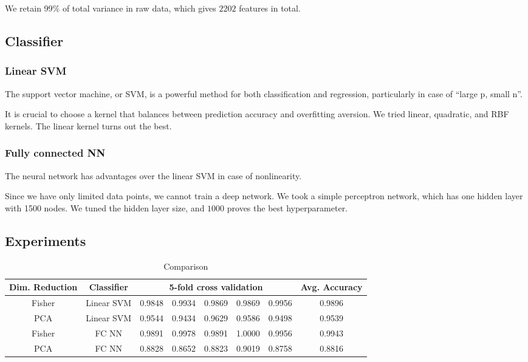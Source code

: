 \documentclass{article}
\begin{document}
{{{            We retain 99\% of total variance in raw data, which gives $2202$ features in total. 
        }
    }

    \subsection{Classifier}
    {
        \subsubsection{Linear SVM}
        {
            The support vector machine, or SVM, is a powerful method for both classification and regression, particularly in case of ``large p, small n''.

            It is crucial to choose a kernel that balances between prediction accuracy and overfitting aversion. 
            We tried linear, quadratic, and RBF kernels. The linear kernel turns out the best.
        }

        \subsubsection{Fully connected NN}
        {
            The neural network has advantages over the linear SVM in case of nonlinearity. 

            Since we have only limited data points, we cannot train a deep network. 
            We took a simple perceptron network, which has one hidden layer with 1500 nodes. 
            We tuned the hidden layer size, and $1000$ proves the best hyperparameter.
        }
    }

    \subsection{Experiments}
    {
        \begin{table}[!hbp]
            \centering
            \begin{tabular}{|c|c|c|c|c|c|c|c|}
            \hline
            Dim. Reduction & Classifier & \multicolumn{5}{|c|}{5-fold cross validation} & Avg. Accuracy \\
            \hline
            Fisher & Linear SVM & 0.9848 & 0.9934 & 0.9869 & 0.9869 & 0.9956 & 0.9896 \\
            \hline
            PCA & Linear SVM & 0.9544 & 0.9434 & 0.9629 & 0.9586 & 0.9498 & 0.9539 \\
            \hline
            Fisher & FC NN & 0.9891 & 0.9978 & 0.9891 & 1.0000 & 0.9956 & 0.9943 \\
            \hline
            PCA & FC NN & 0.8828 & 0.8652 & 0.8823 & 0.9019 & 0.8758 & 0.8816 \\
            \hline
            \end{tabular}
            \caption{Comparison}
        \end{table}

}}
\end{document}
